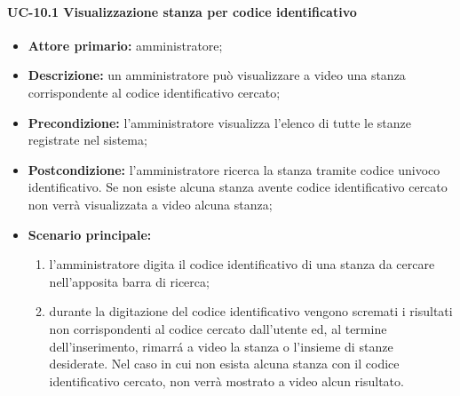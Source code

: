 \paragraph{UC-10.1 Visualizzazione stanza per codice identificativo}
\begin{itemize}
    \item \textbf{Attore primario:} amministratore;
    \item \textbf{Descrizione:} un amministratore pu\`{o} visualizzare a video una stanza corrispondente al codice identificativo cercato;
    \item \textbf{Precondizione:} l'amministratore visualizza l'elenco di tutte le stanze registrate nel sistema;
    \item \textbf{Postcondizione:} l'amministratore ricerca la stanza tramite codice univoco identificativo. Se non esiste alcuna stanza avente codice identificativo cercato non verrà visualizzata a video alcuna stanza;
    \item \textbf{Scenario principale:}
    \begin{enumerate}
        \item l'amministratore digita il codice identificativo di una stanza da cercare nell'apposita barra di ricerca;
        \item durante la digitazione del codice identificativo vengono scremati i risultati non corrispondenti al codice cercato dall'utente ed, al termine dell'inserimento, rimarr\'{a} a video la stanza o l'insieme di stanze desiderate. Nel caso in cui non esista alcuna stanza con il codice identificativo cercato, non verrà mostrato a video alcun risultato.
    \end{enumerate}
\end{itemize}

